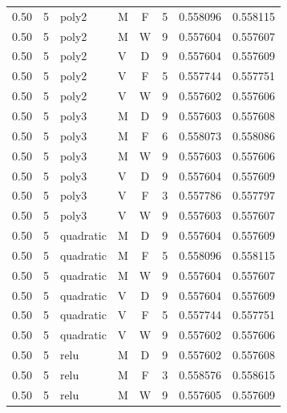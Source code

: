 \begin{longtable}{rrllcrrr}
0.50 & 5 & poly2 & M & F & 5 & 0.558096 & 0.558115 \\

0.50 & 5 & poly2 & M & W & 9 & 0.557604 & 0.557607 \\

0.50 & 5 & poly2 & V & D & 9 & 0.557604 & 0.557609 \\

0.50 & 5 & poly2 & V & F & 5 & 0.557744 & 0.557751 \\

0.50 & 5 & poly2 & V & W & 9 & 0.557602 & 0.557606 \\

0.50 & 5 & poly3 & M & D & 9 & 0.557603 & 0.557608 \\

0.50 & 5 & poly3 & M & F & 6 & 0.558073 & 0.558086 \\

0.50 & 5 & poly3 & M & W & 9 & 0.557603 & 0.557606 \\

0.50 & 5 & poly3 & V & D & 9 & 0.557604 & 0.557609 \\

0.50 & 5 & poly3 & V & F & 3 & 0.557786 & 0.557797 \\

0.50 & 5 & poly3 & V & W & 9 & 0.557603 & 0.557607 \\

0.50 & 5 & quadratic & M & D & 9 & 0.557604 & 0.557609 \\

0.50 & 5 & quadratic & M & F & 5 & 0.558096 & 0.558115 \\

0.50 & 5 & quadratic & M & W & 9 & 0.557604 & 0.557607 \\

0.50 & 5 & quadratic & V & D & 9 & 0.557604 & 0.557609 \\

0.50 & 5 & quadratic & V & F & 5 & 0.557744 & 0.557751 \\

0.50 & 5 & quadratic & V & W & 9 & 0.557602 & 0.557606 \\

0.50 & 5 & relu & M & D & 9 & 0.557602 & 0.557608 \\

0.50 & 5 & relu & M & F & 3 & 0.558576 & 0.558615 \\

0.50 & 5 & relu & M & W & 9 & 0.557605 & 0.557609 \\


\end{longtable}
